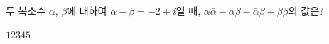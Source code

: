 두 복소수 $\alpha$, $\beta$에 대하여 $\alpha-\beta=-2+i$일 때, $\alpha\bar{\alpha}-\alpha\bar{\beta}-\bar{\alpha}\beta+\beta\bar{\beta}$의 값은? 
\begin{choices32}{$1$}{$2$}{$3$}{$4$}{$5$}\end{choices32}
